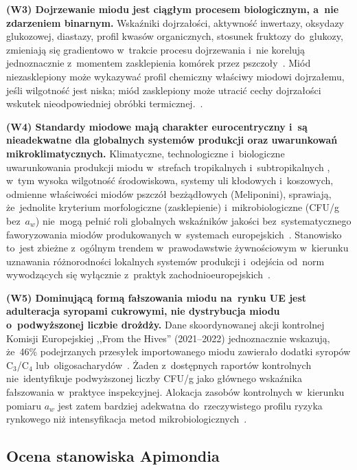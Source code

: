 \textbf{(W3) Dojrzewanie miodu jest ciągłym procesem biologicznym, a~nie zdarzeniem binarnym.}
Wskaźniki dojrzałości, aktywność inwertazy, oksydazy
glukozowej, diastazy, profil kwasów organicznych,
stosunek fruktozy do~glukozy, zmieniają się gradientowo
w~trakcie procesu dojrzewania i~nie korelują jednoznacznie
z~momentem zasklepienia komórek przez pszczoły~\cite{zhang2021,sun2021}.
Miód niezasklepiony może wykazywać profil chemiczny
właściwy miodowi dojrzałemu, jeśli wilgotność jest niska;
miód zasklepiony może utracić cechy dojrzałości wskutek
nieodpowiedniej obróbki termicznej.~\cite{codex_stan12,guo2020,zhang2021}.

\textbf{(W4) Standardy miodowe mają charakter eurocentryczny i~są nieadekwatne dla globalnych systemów produkcji oraz uwarunkowań mikroklimatycznych.}
Klimatyczne, technologiczne i~biologiczne uwarunkowania
produkcji miodu w~strefach tropikalnych i~subtropikalnych
, w~tym wysoka wilgotność środowiskowa, systemy uli
kłodowych i~koszowych, odmienne właściwości miodów
pszczół bezżądłowych (Meliponini), sprawiają,
że~jednolite kryterium morfologiczne (zasklepienie)
i~mikrobiologiczne (CFU/g bez~$a_w$) nie~mogą pełnić
roli globalnych wskaźników jakości bez~systematycznego
faworyzowania miodów produkowanych w~systemach
europejskich~\cite{tadele2025,stinglessyeastbrazil2021,sciendo2012}.
Stanowisko to~jest zbieżne z~ogólnym trendem w~prawodawstwie
żywnościowym w~kierunku uznawania różnorodności lokalnych
systemów produkcji i~odejścia od~norm wywodzących się
wyłącznie z~praktyk zachodnioeuropejskich~\cite{phiri2022}.

\textbf{(W5) Dominującą formą fałszowania miodu na~rynku UE jest adulteracja syropami cukrowymi, nie dystrybucja miodu o~podwyższonej liczbie drożdży.}
Dane skoordynowanej akcji kontrolnej Komisji Europejskiej
,,From the Hives'' (2021--2022) jednoznacznie wskazują,
że~46\% podejrzanych przesyłek importowanego miodu
zawierało dodatki syropów C$_3$/C$_4$
lub~oligosacharydów~\cite{eufromhives2021}. Żaden
z~dostępnych raportów kontrolnych nie~identyfikuje
podwyższonej liczby CFU/g jako głównego wskaźnika
fałszowania w~praktyce inspekcyjnej. Alokacja zasobów
kontrolnych w~kierunku pomiaru $a_w$ jest
zatem bardziej adekwatna do~rzeczywistego profilu
ryzyka rynkowego niż intensyfikacja metod
mikrobiologicznych~\cite{schoder2026,eufromhives2021}.

\subsection{Ocena stanowiska Apimondia}

